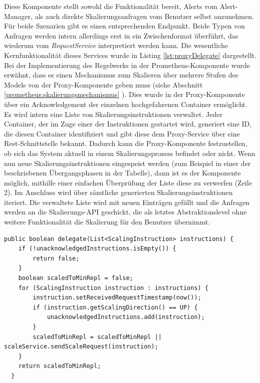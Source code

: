 Diese Komponente stellt sowohl die Funktionalität bereit, Alerts vom Alert-Manager, als auch direkte Skalierungsanfragen vom Benutzer selbst anzunehmen. Für beide Szenarien gibt es einen entsprechenden Endpunkt. Beide Typen von Anfragen werden intern allerdings erst in ein Zwischenformat überführt, das wiederum vom \emph{RequestService} interpretiert werden kann. Die wesentliche Kernfunktionalität dieses Services wurde in Listing \ref{lst:proxyDelegate}  dargestellt. Bei der Implementierung des Regelwerks in der Prometheus-Komponente wurde erwähnt, dass es einen Mechanismus zum Skalieren über mehrere Stufen des Models von der Proxy-Komponente geben muss (siehe Abschnitt \ref{prometheus:skalierungsmechanismus} ). Dies wurde in der Proxy-Komponente über ein Acknowledgement der einzelnen hochgefahrenen Container ermöglicht. Es wird intern eine Liste von Skalierungsinstruktionen verwaltet. Jeder Container, der im Zuge einer der Instruktionen gestartet wird, generiert eine ID, die diesen Container identifiziert und gibt diese dem Proxy-Service über eine Rest-Schnittstelle bekannt. Dadurch kann die Proxy-Komponente festzustellen, ob sich das System aktuell in einem Skalierungsprozess befindet oder nicht. Wenn nun neue Skalierungsinstruktionen eingespeist werden (zum Beispiel in einer der beschriebenen Übergangsphasen in der Tabelle), dann ist es der Komponente möglich, mithilfe einer einfachen Überprüfung der Liste diese zu verwerfen (Zeile 2). Im Anschluss wird über sämtliche generierten Skalierungsinstruktionen iteriert. Die verwaltete Liste wird mit neuen Einträgen gefüllt und die Anfragen werden an die Skalierungs-API geschickt, die als letztes Abstraktionslevel ohne weitere Funktionalität die Skalierung für den Benutzer übernimmt. 

\begin{minipage}{\linewidth}
\begin{lstlisting}[style=javaStyle,caption={Proxy Scaler -- RequestService},label=lst:proxyDelegate]
  public boolean delegate(List<ScalingInstruction> instructions) {
    if (!unacknowledgedInstructions.isEmpty()) {
        return false;
    }
    boolean scaledToMinRepl = false;
    for (ScalingInstruction instruction : instructions) {
        instruction.setReceivedRequestTimestamp(now());
        if (instruction.getScalingDirection() == UP) {
            unacknowledgedInstructions.add(instruction);
        }
        scaledToMinRepl = scaledToMinRepl || scaleService.sendScaleRequest(instruction);
    }
    return scaledToMinRepl;
  }
\end{lstlisting}
\end{minipage}

